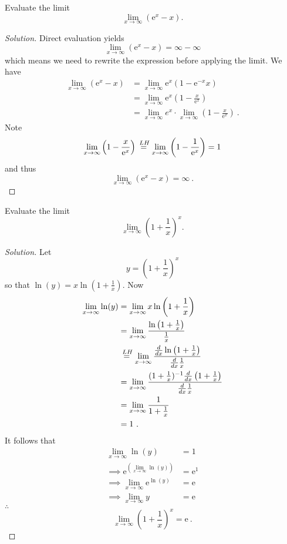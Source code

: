 \documentclass[compacto,10pt,comentarios]{aleph-notas}
\newcommand*\Heq{\ensuremath{\overset{\kern2pt LH}{=}}}
\begin{document}
\begin{ejer}
    Evaluate the limit
    $$
        \lim_{x \to \infty} \left(\mathrm{e}^{x} - x \right).
    $$
\end{ejer}
\begin{proof}[Solution]
    Direct evaluation yields
    $$
    \lim_{x \to \infty} \left(\mathrm{e}^{x} - x \right)
    = \infty - \infty
    $$
    which means we need to rewrite the expression before applying the limit. We have
    \begin{align*}
        \lim_{x \to \infty} \left(\mathrm{e}^{x} - x \right)
        & = \lim_{x \to \infty} \mathrm{e}^{x} \left(1 - \mathrm{e}^{-x} x \right) \\
        & = \lim_{x \to \infty} \mathrm{e}^{x} \left(1 - \frac{x}{\mathrm{e}^{x}} \right) \\
        & = \lim_{x \to \infty} e^{x} \cdot \lim_{x \to \infty} \left(1 - \frac{x}{\mathrm{e}^{x}} \right) ~ .
    \end{align*}
    Note
    $$
        \lim_{x \to \infty} \left(1 - \frac{x}{\mathrm{e}^{x}} \right) \Heq \lim_{x \to \infty} \left(1 - \frac{1}{\mathrm{e}^{x}} \right) = 1
    $$
    and thus
    $$
        \lim_{x \to \infty} \left(\mathrm{e}^{x} - x \right) = \infty ~ .
    $$
\end{proof}

\begin{ejer}
    Evaluate the limit
    $$
        \lim_{x \to \infty} \left( 1 + \frac{1}{x} \right)^{x}.
    $$
\end{ejer}
\begin{proof}[Solution]
    Let 
    $$
        y = \left( 1 + \frac{1}{x} \right)^{x}
    $$
    so that $\ln(y) = x \ln\left(1 + \frac{1}{x}\right)$. Now
    \begin{align*}
        \lim_{x \to \infty} \ln(y) 
        & = \lim_{x \to \infty} x \ln\left(1 + \frac{1}{x}\right) \\
        & = \lim_{x \to \infty} \frac{\ln\left(1 + \frac{1}{x}\right)}{\frac{1}{x}} \\ 
        & \Heq \lim_{x \to \infty} \frac{\frac{d}{dx} \ln\left(1 + \frac{1}{x} \right)}{\frac{d}{dx} \frac{1}{x}} \\ 
        & = \lim_{x \to \infty} \frac{ (1 + \frac{1}{x})^{-1} \frac{d}{dx} \left(1 + \frac{1}{x} \right)}{\frac{d}{dx} \frac{1}{x}} \\
        & = \lim_{x \to \infty} \frac{1}{1 + \frac{1}{x}} \\
        & = 1 ~ .
    \end{align*}
    It follows that
    \begin{align*}
        \lim_{x \to \infty} \ln(y) & = 1 \\
        \implies \mathrm{e}^{\left( \displaystyle \lim_{x \to \infty} \ln(y) \right)} & = \mathrm{e}^{1} \\
        \implies \lim_{x \to \infty} \mathrm{e}^{\ln(y)} & = \mathrm{e} \\
        \implies \lim_{x \to \infty} y & = \mathrm{e}
    \end{align*}
    $\therefore$
    $$
    \lim_{x \to \infty} \left( 1 + \frac{1}{x} \right)^{x} = \mathrm{e} ~ .
    $$
\end{proof}
\end{document}
